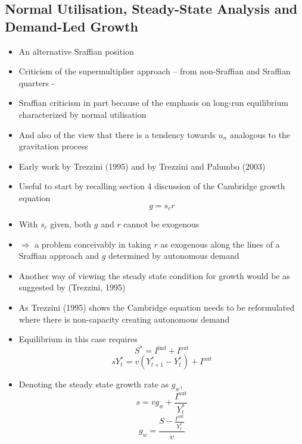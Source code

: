 \documentclass{article}
\begin{document}
\subsection{Normal Utilisation, Steady-State Analysis and Demand-Led Growth}
	\begin{itemize}
		\item An alternative Sraffian position
		\item Criticism of the supermultiplier approach -- from non-Sraffian and Sraffian quarters -
		\item Sraffian criticism in part because of the emphasis on long-run equilibrium characterized by normal utilisation
		\item And also of the view that there is a tendency towards \( u_n \) analogous to the gravitation process
		\item Early work by Trezzini (1995) and by Trezzini and Palumbo (2003)
		\item Useful to start by recalling section 4 discussion of the Cambridge growth equation
		\[
			g = s_c r
		\]
		\item With \( s_c \) given, both \( g \) and \( r \) cannot be exogenous
		\item \( \Rightarrow \) a problem conceivably in taking \( r \) as exogenous along the lines of a Sraffian approach and \( g \) determined by autonomous demand
		\item Another way of viewing the steady state condition for growth would be as suggested by (Trezzini, 1995)
		\item As Trezzini (1995) shows the Cambridge equation needs to be reformulated where there is non-capacity creating autonomous demand
		\item Equilibrium in this case requires
		\begin{equation}
			S^* = I^\text{ind} + I^\text{aut} \label{E:5.10}
		\end{equation}
		\begin{equation}
			sY_t^* = v \left( Y_{t+1}^* - Y_t^* \right) + I^\text{aut} \label{E:5.11}
		\end{equation}
		\item Denoting the steady state growth rate as \( g_w \),
		\begin{equation}
			s = vg_w + \frac{I^\text{aut}}{Y_t^*} \label{E:5.12}
		\end{equation}
		\begin{equation}
			g_w = \frac{S-\frac{I^\text{aut}}{Y_t^*}}{v} \label{E:5.13}
		\end{equation}

\end{itemize}
\end{document}
